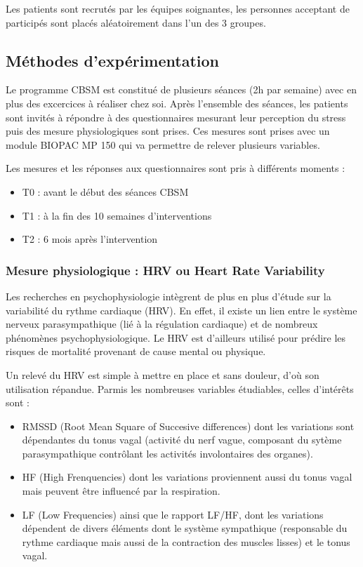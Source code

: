 \documentclass[]{article}
\providecommand{\tightlist}{%
  \setlength{\itemsep}{0pt}\setlength{\parskip}{0pt}}
\begin{document}
Les patients sont recrutés par les équipes soignantes, les personnes
acceptant de participés sont placés aléatoirement dans l'un des 3
groupes.

\hypertarget{methodes-dexperimentation}{%
\subsection{Méthodes
d'expérimentation}\label{methodes-dexperimentation}}

Le programme CBSM est constitué de plusieurs séances (2h par semaine)
avec en plus des excercices à réaliser chez soi. Après l'ensemble des
séances, les patients sont invités à répondre à des questionnaires
mesurant leur perception du stress puis des mesure physiologiques sont
prises. Ces mesures sont prises avec un module BIOPAC MP 150 qui va
permettre de relever plusieurs variables.

Les mesures et les réponses aux questionnaires sont pris à différents
moments :

\begin{itemize}
\tightlist
\item
  T0 : avant le début des séances CBSM
\item
  T1 : à la fin des 10 semaines d'interventions
\item
  T2 : 6 mois après l'intervention
\end{itemize}

\hypertarget{mesure-physiologique-hrv-ou-heart-rate-variability}{%
\subsubsection{Mesure physiologique : HRV ou Heart Rate
Variability}\label{mesure-physiologique-hrv-ou-heart-rate-variability}}

Les recherches en psychophysiologie intègrent de plus en plus d'étude
sur la variabilité du rythme cardiaque (HRV). En effet, il existe un
lien entre le système nerveux parasympathique (lié à la régulation
cardiaque) et de nombreux phénomènes psychophysiologique. Le HRV est
d'ailleurs utilisé pour prédire les risques de mortalité provenant de
cause mental ou physique.

Un relevé du HRV est simple à mettre en place et sans douleur, d'où son
utilisation répandue. Parmis les nombreuses variables étudiables, celles
d'intérêts sont :

\begin{itemize}
\tightlist
\item
  RMSSD (Root Mean Square of Succesive differences) dont les variations
  sont dépendantes du tonus vagal (activité du nerf vague, composant du
  sytème parasympathique contrôlant les activités involontaires des
  organes).
\item
  HF (High Frenquencies) dont les variations proviennent aussi du tonus
  vagal mais peuvent être influencé par la respiration.
\item
  LF (Low Frequencies) ainsi que le rapport LF/HF, dont les variations
  dépendent de divers éléments dont le système sympathique (responsable
  du rythme cardiaque mais aussi de la contraction des muscles lisses)
  et le tonus vagal.
\end{itemize}
\end{document}
